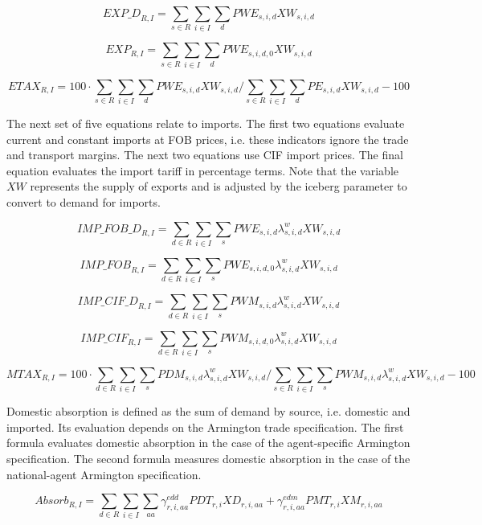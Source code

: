 \[
\mathit{EXP\_D}_{R,I} =
\sum_{s \in R} {\sum_{i \in I} {
\sum_d
{\mathit{PWE}_{s,i,d} \mathit{XW}_{s,i,d}}
}}
\]

\[
\mathit{EXP}_{R,I} =
\sum_{s \in R} {\sum_{i \in I} {
		\sum_d
		{\mathit{PWE}_{s,i,d,0} \mathit{XW}_{s,i,d}}
}}
\]

\[
\mathit{ETAX}_{R,I} =
100 \cdot \sum_{s \in R} {\sum_{i \in I} {
		\sum_d
		{\mathit{PWE}_{s,i,d} \mathit{XW}_{s,i,d}}
}} \bigg/
\sum_{s \in R} {\sum_{i \in I} {
		\sum_d
		{\mathit{PE}_{s,i,d} \mathit{XW}_{s,i,d}}
}} - 100
\]

The next set of five equations relate to
imports. The first two equations evaluate current
and constant imports at FOB prices, i.e. these indicators
ignore the trade and transport margins.
The next two equations use CIF import prices.
The final equation evaluates the import tariff
in percentage terms.
Note that the variable $\mathit{XW}$ represents
the supply of exports and is adjusted
by the iceberg parameter to convert to demand
for imports.

\[
\mathit{IMP\_FOB\_D}_{R,I} =
\sum_{d \in R} {\sum_{i \in I} {
		\sum_s
		{\mathit{PWE}_{s,i,d} \lambda^w_{s,i,d} \mathit{XW}_{s,i,d}}
}}
\]

\[
\mathit{IMP\_FOB}_{R,I} =
\sum_{d \in R} {\sum_{i \in I} {
		\sum_s
		{\mathit{PWE}_{s,i,d,0} \lambda^w_{s,i,d} \mathit{XW}_{s,i,d}}
}}
\]

\[
\mathit{IMP\_CIF\_D}_{R,I} =
\sum_{d \in R} {\sum_{i \in I} {
		\sum_s
		{\mathit{PWM}_{s,i,d} \lambda^w_{s,i,d} \mathit{XW}_{s,i,d}}
}}
\]

\[
\mathit{IMP\_CIF}_{R,I} =
\sum_{d \in R} {\sum_{i \in I} {
		\sum_s
		{\mathit{PWM}_{s,i,d,0} \lambda^w_{s,i,d} \mathit{XW}_{s,i,d}}
}}
\]

\[
\mathit{MTAX}_{R,I} =
100 \cdot \sum_{d \in R} {\sum_{i \in I} {
		\sum_s
		{\mathit{PDM}_{s,i,d} \lambda^w_{s,i,d} \mathit{XW}_{s,i,d}}
}} \bigg/
\sum_{s \in R} {\sum_{i \in I} {
		\sum_s
		{\mathit{PWM}_{s,i,d} \lambda^w_{s,i,d} \mathit{XW}_{s,i,d}}
}} - 100
\]

Domestic absorption is defined as the sum
of demand by source, i.e. domestic and imported.
Its evaluation depends on the Armington trade
specification. The first formula evaluates
domestic absorption in the case of the agent-specific
Armington specification. The second
formula measures domestic absorption in the case
of the national-agent Armington specification.

\[
\mathit{Absorb}_{R,I} =
\sum_{d \in R} {\sum_{i \in I} {
		\sum_{\mathit{aa}}
		{\gamma^{\mathit{edd}}_{r,i,\mathit{aa}} \mathit{PDT}_{r,i} \mathit{XD}_{r,i,\mathit{aa}} +
			\gamma^{\mathit{edm}}_{r,i,\mathit{aa}} \mathit{PMT}_{r,i} \mathit{XM}_{r,i,\mathit{aa}}
		}
}}
\]

